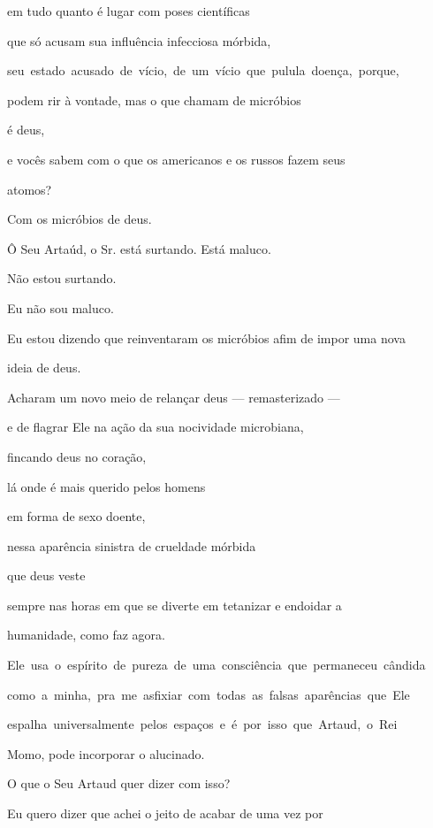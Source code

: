 em tudo quanto é lugar com poses científicas

que só acusam sua influência infecciosa mórbida,

\mbox{seu estado acusado de vício, de um vício que pulula doença, porque,}

podem rir à vontade, mas o que chamam de micróbios

é deus, 

e vocês sabem com o que os americanos e os russos fazem seus

atomos?

Com os micróbios de deus.


Ô Seu Artaúd, o Sr. está surtando. Está maluco.


Não estou surtando.

Eu não sou maluco.

Eu estou dizendo que reinventaram os micróbios afim de impor uma nova

ideia de deus.

Acharam um novo meio de relançar deus --- remasterizado ---

e de flagrar Ele na ação da sua nocividade microbiana,

fincando deus no coração,

lá onde é mais querido pelos homens

em forma de sexo doente,

nessa aparência sinistra de crueldade mórbida

que deus veste

sempre nas horas em que se diverte em tetanizar e endoidar a

humanidade, como faz agora.

\mbox{Ele usa o espírito de pureza de uma consciência que permaneceu cândida}

\mbox{como a minha, pra me asfixiar com todas as falsas aparências que Ele}

\mbox{espalha universalmente pelos espaços e é por isso que Artaud, o Rei}

Momo, pode incorporar o alucinado.



O que o Seu Artaud quer dizer com isso?


Eu quero dizer que achei o jeito de acabar de uma vez por

